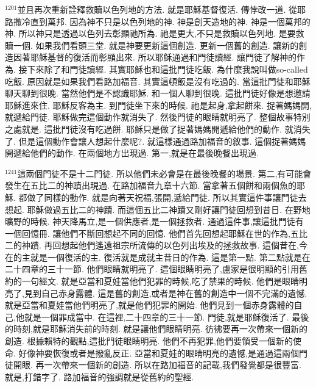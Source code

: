 \documentclass{book}
\begin{document}
$^{1201}$並且再次重新詮釋救贖以色列地的方法.
就是耶穌基督復活.
傳悖改一道.
從耶路撒冷直到萬邦.
因為神不只是以色列地的神.
神是創天造地的神.
神是一個萬邦的神.
所以神只是透過以色列去彰顯祂所為.
祂是更大,不只是救贖以色列地.
是要救贖一個.
如果我們看頭三堂.
就是神要更新這個創造.
更新一個舊的創造.
讓新的創造因著耶穌基督的復活而彰顯出來.
所以耶穌通過和門徒讀經.
讓門徒了解神的作為.
接下來除了和門徒讀經.
其實耶穌也和這批門徒吃飯.
為什麼我說叫做so-called吃飯.
原因就是如果我們看路加福音.
其實這頓飯是沒有吃過的.
當這批門徒和耶穌聊天聊到很晚.
當然他們是不認識耶穌.
和一個人聊到很晚.
這批門徒好像是想邀請耶穌進來住.
耶穌反客為主.
到門徒坐下來的時候.
祂是起身,拿起餅來.
捉著媽媽開,就遞給門徒.
耶穌做完這個動作就消失了.
然後門徒的眼睛就明亮了.
整個故事特別之處就是.
這批門徒沒有吃過餅.
耶穌只是做了捉著媽媽開遞給他們的動作.
就消失了.
但是這個動作會讓人想起什麼呢?.
就這樣通過路加福音的敘事.
這個捉著媽媽開遞給他們的動作.
在兩個地方出現過.
第一,就是在最後晚餐出現過.

$^{1241}$這兩個門徒不是十二門徒.
所以他們未必會是在最後晚餐的場景.
第二,有可能會發生在五比二的神蹟出現過.
在路加福音九章十六節.
當拿著五個餅和兩個魚的耶穌.
都做了同樣的動作.
就是向著天祝福,張開,遞給門徒.
所以其實這件事讓門徒去想起.
耶穌做過五比二的神蹟.
而這個五比二神蹟又剛好讓門徒回想到昔日.
在野地曠野的時候.
神天降馬立,是一個供應者,是一個拯救者.
通過這件事,讓這批門徒有一個回憶冊.
讓他們不斷回想起不同的回憶.
他們首先回想起耶穌在世的作為,五比二的神蹟.
再回想起他們遙遠祖宗所流傳的以色列出埃及的拯救故事.
這個昔在,今在的主就是一個復活的主.
復活就是成就主昔日的作為.
這是第一點.
第二點就是在二十四章的三十一節.
他們眼睛就明亮了.
這個眼睛明亮了,盧家是很明顯的引用舊約的一句經文.
就是亞當和夏娃當他們犯罪的時候,吃了禁果的時候.
他們是眼睛明亮了,見到自己赤身露體.
這是舊的創造,或者是神在舊的創造中一個不完滿的遺憾.
就是亞當和夏娃當他們明亮了,就是他們犯罪的開始.
他們見到一個赤身露體的自己,他就是一個罪成當中.
在這裡,二十四章的三十一節.
門徒,就是耶穌復活了.
最後的時刻,就是耶穌消失前的時刻.
就是讓他們眼睛明亮.
彷彿要再一次帶來一個新的創造.
根據賴特的觀點,這批門徒眼睛明亮.
他們不再犯罪,他們要領受一個新的使命.
好像神要恢復或者是撥亂反正.
亞當和夏娃的眼睛明亮的遺憾,是通過這兩個門徒開眼.
再一次帶來一個新的創造.
所以在路加福音的記載,我們發覺都是很豐富.
就是,打錯字了.
路加福音的強調就是從舊約的聖經.
\end{document}
